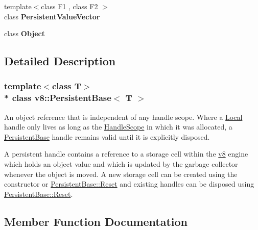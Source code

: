 \begin{DoxyCompactItemize}
\item 
{\footnotesize template$<$class F1 , class F2 $>$ }\\class {\bfseries Persistent\+Value\+Vector}\hypertarget{classv8_1_1_persistent_base_a978bb1377559897d74d5fe883a54a315}{}\label{classv8_1_1_persistent_base_a978bb1377559897d74d5fe883a54a315}

\item 
class {\bfseries Object}\hypertarget{classv8_1_1_persistent_base_a0720b5f434e636e22a3ed34f847eec57}{}\label{classv8_1_1_persistent_base_a0720b5f434e636e22a3ed34f847eec57}

\end{DoxyCompactItemize}


\subsection{Detailed Description}
\subsubsection*{template$<$class T$>$\\*
class v8\+::\+Persistent\+Base$<$ T $>$}

An object reference that is independent of any handle scope. Where a \hyperlink{classv8_1_1_local}{Local} handle only lives as long as the \hyperlink{classv8_1_1_handle_scope}{Handle\+Scope} in which it was allocated, a \hyperlink{classv8_1_1_persistent_base}{Persistent\+Base} handle remains valid until it is explicitly disposed.

A persistent handle contains a reference to a storage cell within the \hyperlink{namespacev8}{v8} engine which holds an object value and which is updated by the garbage collector whenever the object is moved. A new storage cell can be created using the constructor or \hyperlink{classv8_1_1_persistent_base_a174bb1e45b18fd4eeaee033622825bb8}{Persistent\+Base\+::\+Reset} and existing handles can be disposed using \hyperlink{classv8_1_1_persistent_base_a174bb1e45b18fd4eeaee033622825bb8}{Persistent\+Base\+::\+Reset}. 

\subsection{Member Function Documentation}
